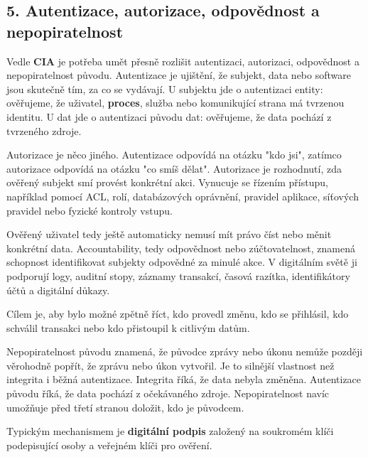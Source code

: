 \subsection*{5. Autentizace, autorizace, odpovědnost a nepopiratelnost}

Vedle \textbf{CIA} je potřeba umět přesně rozlišit autentizaci, autorizaci, odpovědnost a nepopiratelnost původu. Autentizace je ujištění, že subjekt, data nebo software jsou skutečně tím, za co se vydávají. U subjektu jde o autentizaci entity: ověřujeme, že uživatel, \textbf{proces}, služba nebo komunikující strana má tvrzenou identitu. U dat jde o autentizaci původu dat: ověřujeme, že data pochází z tvrzeného zdroje.

Autorizace je něco jiného. Autentizace odpovídá na otázku "kdo jsi", zatímco autorizace odpovídá na otázku "co smíš dělat". Autorizace je rozhodnutí, zda ověřený subjekt smí provést konkrétní akci. Vynucuje se řízením přístupu, například pomocí ACL, rolí, databázových oprávnění, pravidel aplikace, síťových pravidel nebo fyzické kontroly vstupu.

Ověřený uživatel tedy ještě automaticky nemusí mít právo číst nebo měnit konkrétní data. Accountability, tedy odpovědnost nebo zúčtovatelnost, znamená schopnost identifikovat subjekty odpovědné za minulé akce. V digitálním světě ji podporují logy, auditní stopy, záznamy transakcí, časová razítka, identifikátory účtů a digitální důkazy.

Cílem je, aby bylo možné zpětně říct, kdo provedl změnu, kdo se přihlásil, kdo schválil transakci nebo kdo přistoupil k citlivým datům.

Nepopiratelnost původu znamená, že původce zprávy nebo úkonu nemůže později věrohodně popřít, že zprávu nebo úkon vytvořil. Je to silnější vlastnost než integrita i běžná autentizace. Integrita říká, že data nebyla změněna. Autentizace původu říká, že data pochází z očekávaného zdroje. Nepopiratelnost navíc umožňuje před třetí stranou doložit, kdo je původcem.

Typickým mechanismem je \textbf{digitální podpis} založený na soukromém klíči podepisující osoby a veřejném klíči pro ověření.


